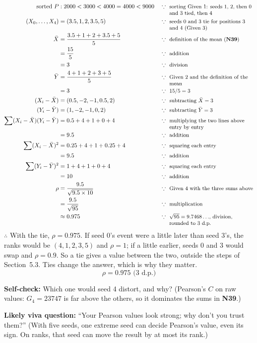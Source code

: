 \documentclass[11pt,a4paper,oneside,openany]{report}
\newcommand{\gl}[1]{\textbf{#1}}   %
\newcommand{\why}[1]{\because\ \parbox[t]{5.0cm}{\raggedright\small #1}}
\newcommand{\fself}{\par\textbf{Self-check:} }
\newcommand{\fviva}{\par\textbf{Likely viva question:} }
\begin{document}
\begin{align*}
\text{sorted } P &: 2000 < 3000 < 4000 = 4000 < 9000 && \why{sorting Given 1: seeds 1, 2, then 0 and 3 tied, then 4} \\
(X_0, \ldots, X_4) &= (3.5, 1, 2, 3.5, 5) && \why{seeds 0 and 3 tie for positions 3 and 4 (Given 3)} \\
\bar X &= \frac{3.5 + 1 + 2 + 3.5 + 5}{5} && \why{definition of the mean (\gl{N39})} \\
       &= \frac{15}{5} && \why{addition} \\
       &= 3 && \why{division} \\
\bar Y &= \frac{4 + 1 + 2 + 3 + 5}{5} && \why{Given 2 and the definition of the mean} \\
       &= 3 && \why{$15/5 = 3$} \\
(X_i - \bar X) &= (0.5, -2, -1, 0.5, 2) && \why{subtracting $\bar X = 3$} \\
(Y_i - \bar Y) &= (1, -2, -1, 0, 2) && \why{subtracting $\bar Y = 3$} \\
\sum (X_i - \bar X)(Y_i - \bar Y) &= 0.5 + 4 + 1 + 0 + 4 && \why{multiplying the two lines above entry by entry} \\
  &= 9.5 && \why{addition} \\
\sum (X_i - \bar X)^2 &= 0.25 + 4 + 1 + 0.25 + 4 && \why{squaring each entry} \\
  &= 9.5 && \why{addition} \\
\sum (Y_i - \bar Y)^2 &= 1 + 4 + 1 + 0 + 4 && \why{squaring each entry} \\
  &= 10 && \why{addition} \\
\rho &= \frac{9.5}{\sqrt{9.5 \times 10}} && \why{Given 4 with the three sums above} \\
     &= \frac{9.5}{\sqrt{95}} && \why{multiplication} \\
     &\approx 0.975 && \why{$\sqrt{95} = 9.7468\ldots$, division, rounded to 3 d.p.}
\end{align*}
$\therefore$ With the tie, $\rho = 0.975$. If seed 0's event were a little later than seed 3's, the ranks would be $(4, 1, 2, 3, 5)$ and $\rho = 1$; if a little earlier, seeds 0 and 3 would swap and $\rho = 0.9$. So a tie gives a value between the two, outside the steps of Section~5.3. Ties change the answer, which is why they matter.
\[\boxed{\rho = 0.975 \text{ (3 d.p.)}}\]

\fself Which one would seed 4 distort, and why? (Pearson's $C$ on raw values: $G_4 = 23747$ is far above the others, so it dominates the sums in \gl{N39}.)
\fviva ``Your Pearson values look strong; why don't you trust them?'' (With five seeds, one extreme seed can decide Pearson's value, even its sign. On ranks, that seed can move the result by at most its rank.)
\end{document}
